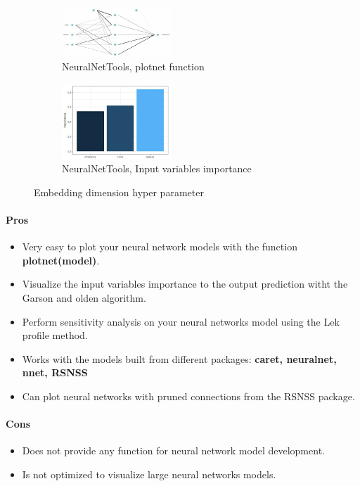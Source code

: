 \documentclass[letter,8pt]{article}\usepackage[]{graphicx}\usepackage[]{color}
\begin{document}
\begin{figure}[H]
  \begin{subfigure}{0.5\textwidth}
    \centering\includegraphics[width=0.45\textwidth]{figure/plotnet.png}
    \caption{NeuralNetTools, plotnet function}
  \end{subfigure}
  \begin{subfigure}{0.5\textwidth}
    \centering\includegraphics[width=0.45\textwidth]{figure/garson_algorithm.png}
    \caption{NeuralNetTools, Input variables importance}
  \end{subfigure}
    \caption{Embedding dimension hyper parameter \cite{Ciaburro2017NeuralNW}}
\end{figure}

\paragraph{Pros}
\begin{itemize}
\item Very easy to plot your neural network models with the function \textbf{plotnet(model)}.
\item Visualize the input variables importance to the output prediction witht the Garson and olden algorithm.
\item Perform sensitivity analysis on your neural networks model using the Lek profile method.
\item Works with the models built from different packages: \textbf{caret, neuralnet, nnet, RSNSS}
\item Can plot neural networks with pruned connections from the RSNSS package.
\end{itemize}

\paragraph{Cons}
\begin{itemize}
\item Does not provide any function for neural network model development.
\item Is not optimized to visualize large neural networks models.
\end{itemize}
\end{document}
